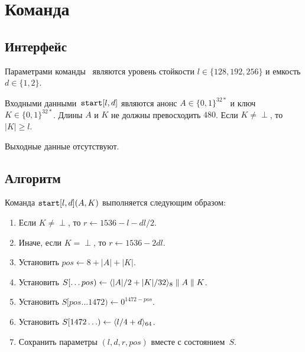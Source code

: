 \section{Команда }\label{PRG.Start}

\subsection{Интерфейс}\label{PRG.Start.IFace}

Параметрами команды~ являются уровень стойкости 
$l\in\{128,192,256\}$ и емкость $d\in\{1,2\}$.

Входными данными~$\texttt{start}[l,d]$ являются анонс $A\in\{0,1\}^{32*}$
и ключ $K\in\{0,1\}^{32*}$. Длины $A$ и $K$ не должны превосходить $480$.
Если $K\neq\perp$, то~$|K|\geq l$.

Выходные данные отсутствуют.

\subsection{Алгоритм}\label{PRG.Start.Alg}

Команда $\texttt{start}[l,d](A,K)$ выполняется следующим образом:
\begin{enumerate}
\item
Если $K\neq\perp$, то $r\leftarrow 1536-l-dl/2$.
\item
Иначе, если $K=\perp$, то $r\leftarrow 1536-2dl$.
\item
Установить
$pos\leftarrow 8+|A|+|K|$.
\item
Установить
$S[\dots pos)\leftarrow 
\langle|A|/2+|K|/32\rangle_8\parallel A\parallel K$.
\item
Установить
$S[pos\dots 1472)\leftarrow 0^{1472-pos}$.
\item
Установить
$S[1472\ldots)\leftarrow\langle l/4+d\rangle_{64}$.
\item
Сохранить параметры $(l, d, r, pos)$ вместе с состоянием~$S$.
\end{enumerate}


